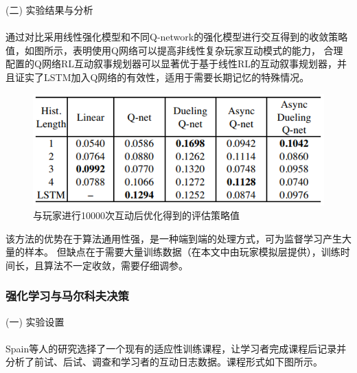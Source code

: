 \documentclass{article}
\begin{document}
            (二) 实验结果与分析\paragraph{}
            通过对比采用线性强化模型和不同Q-network的强化模型进行交互得到的收敛策略值，如图所示，表明使用Q网络可以提高非线性复杂玩家互动模式的能力，
            合理配置的Q网络RL互动叙事规划器可以显著优于基于线性RL的互动叙事规划器，并且证实了LSTM加入Q网络的有效性，适用于需要长期记忆的特殊情况。
            \begin{figure}[H]
            	
            	\centering
            	\includegraphics[scale=0.6]{images/policy_value.png}
            	\caption{与玩家进行10000次互动后优化得到的评估策略值}
            	\label{fig:label}
            \end{figure}

            该方法的优势在于算法通用性强，是一种端到端的处理方式，可为监督学习产生大量的样本。
            但缺点在于需要大量训练数据（在本文中由玩家模拟层提供），训练时间长，且算法不一定收敛，需要仔细调参。

            \subsubsection{强化学习与马尔科夫决策}
            (一) 实验设置\paragraph{}
            Spain等人\cite{ref14}的研究选择了一个现有的适应性训练课程，让学习者完成课程后记录并分析了前试、后试、调查和学习者的互动日志数据。课程形式如下图所示。
\end{document}
